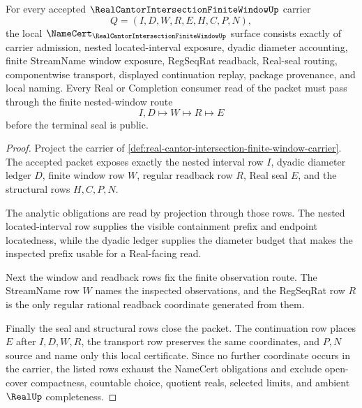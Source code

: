 \begin{theorem}
\label{thm:real-cantor-intersection-nested-window-obligations}
For every accepted $\RealCantorIntersectionFiniteWindowUp$ carrier
$$
Q=(I,D,W,R,E,H,C,P,N),
$$
the local $\NameCert_{\RealCantorIntersectionFiniteWindowUp}$ surface consists exactly of carrier admission, nested located-interval exposure, dyadic diameter accounting, finite StreamName window exposure, RegSeqRat readback, Real-seal routing, componentwise transport, displayed continuation replay, package provenance, and local naming. Every Real or Completion consumer read of the packet must pass through the finite nested-window route
$$
I,D \longmapsto W \longmapsto R \longmapsto E
$$
before the terminal seal is public.
\end{theorem}
\begin{proof}
Project the carrier of \autoref{def:real-cantor-intersection-finite-window-carrier}. The accepted packet exposes exactly the nested interval row $I$, dyadic diameter ledger $D$, finite window row $W$, regular readback row $R$, Real seal $E$, and the structural rows $H,C,P,N$.

The analytic obligations are read by projection through those rows. The nested located-interval row supplies the visible containment prefix and endpoint locatedness, while the dyadic ledger supplies the diameter budget that makes the inspected prefix usable for a Real-facing read.

Next the window and readback rows fix the finite observation route. The StreamName row $W$ names the inspected observations, and the RegSeqRat row $R$ is the only regular rational readback coordinate generated from them.

Finally the seal and structural rows close the packet. The continuation row places $E$ after $I,D,W,R$, the transport row preserves the same coordinates, and $P,N$ source and name only this local certificate. Since no further coordinate occurs in the carrier, the listed rows exhaust the NameCert obligations and exclude open-cover compactness, countable choice, quotient reals, selected limits, and ambient $\RealUp$ completeness.
\end{proof}


